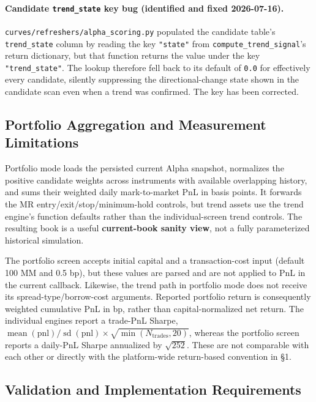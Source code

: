 \paragraph{Candidate \texttt{trend\_state} key bug (identified and fixed 2026-07-16).}
\texttt{curves/refreshers/alpha\_scoring.py} populated the candidate table's
\texttt{trend\_state} column by reading the key \texttt{"state"} from
\texttt{compute\_trend\_signal}'s return dictionary, but that function returns the
value under the key \texttt{"trend\_state"}. The lookup therefore fell back to its
default of \texttt{0.0} for effectively every candidate, silently suppressing the
directional-change state shown in the candidate scan even when a trend was
confirmed. The key has been corrected.

\subsection{Portfolio Aggregation and Measurement Limitations}

Portfolio mode loads the persisted current Alpha snapshot, normalizes the positive
candidate weights across instruments with available overlapping history, and sums
their weighted daily mark-to-market PnL in basis points. It forwards the MR
entry/exit/stop/minimum-hold controls, but trend assets use the trend engine's
function defaults rather than the individual-screen trend controls. The resulting
book is a useful \textbf{current-book sanity view}, not a fully parameterized historical
simulation.

The portfolio screen accepts initial capital and a transaction-cost input (default
100 MM and 0.5 bp), but these values are parsed and are not applied to PnL in the
current callback. Likewise, the trend path in portfolio mode does not receive its
spread-type/borrow-cost arguments. Reported portfolio return is consequently
weighted cumulative PnL in bp, rather than capital-normalized net return. The
individual engines report a trade-PnL Sharpe,
$\operatorname{mean}(\mathrm{pnl})/\operatorname{sd}(\mathrm{pnl})\times\sqrt{\min(N_{\mathrm{trades}},20)}$,
whereas the portfolio screen reports a daily-PnL Sharpe annualized by
$\sqrt{252}$. These are not comparable with each other or directly with the
platform-wide return-based convention in \S1.

\subsection{Validation and Implementation Requirements}


